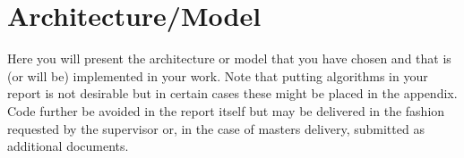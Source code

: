 \chapter{Architecture/Model}
\label{sec:architectureAndModel}

Here you will present the architecture or model that you have chosen and that is (or will be) implemented in your work. Note that putting algorithms in your report is not desirable but in certain cases these might be placed in the appendix. Code further be avoided in the report itself but may be delivered in the fashion requested by the supervisor or, in the case of masters delivery, submitted as additional documents. 
